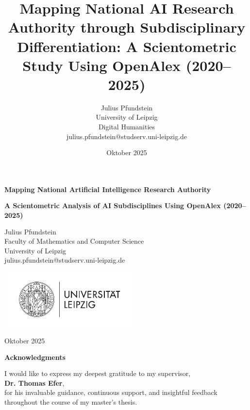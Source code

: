 \documentclass{article}
\title{Mapping National AI Research Authority through Subdisciplinary Differentiation: A Scientometric Study Using OpenAlex (2020–2025)}
\author{Julius Pfundstein \\[1em]
	University of Leipzig \\
	Digital Humanities \\
	julius.pfundstein@studserv.uni-leipzig.de}
\date{Oktober 2025}
\begin{document}
\color{darkergray}


\begin{titlepage}
	
	\vspace*{1cm}
	\centering
	{\LARGE\bfseries Mapping National Artificial Intelligence Research Authority\par}
	\vspace{1em}
	{\LARGE\bfseries A Scientometric Analysis of AI Subdisciplines Using OpenAlex (2020–2025)\par}
	\vspace{3cm}

    {\large
             Julius Pfundstein \\ \vspace{2em}
             Faculty of Mathematics and Computer Science \\ \vspace{2em}
             University of Leipzig \\ \vspace{2em}
             julius.pfundstein@studserv.uni-leipzig.de \par}
    
    \vspace{3cm}
		\includegraphics[height=3cm, keepaspectratio]{university_of_leipzig_logo.pdf} %
    
    \vspace{3cm}  %
    {\large Oktober 2025 \par}
    
    \vfill
    \thispagestyle{empty}
\end{titlepage}

\cleardoublepage
\thispagestyle{empty}

\vspace*{4cm}

\begin{center}
	\Huge\textbf{Acknowledgments}
\end{center}

\vspace{2cm}

\noindent
I would like to express my deepest gratitude to my supervisor,\\
\textbf{Dr. Thomas Efer},\\
for his invaluable guidance, continuous support, and insightful feedback throughout the course of my master’s thesis.
\end{document}

